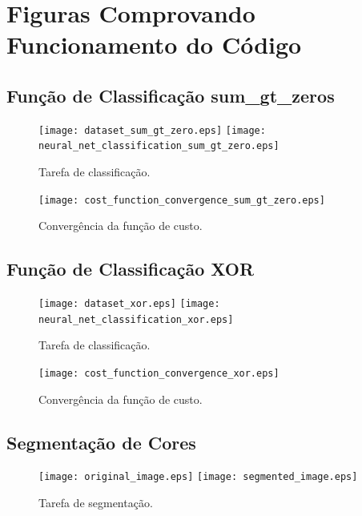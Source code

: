 \documentclass[a4paper,12pt]{article}
\begin{document}
\newpage

\section{Figuras Comprovando Funcionamento do Código}

\subsection{Função de Classificação \textnormal{sum\_gt\_zeros}}

\begin{figure}[!h]
    \centering
    \texttt{[image: dataset\_sum\_gt\_zero.eps]}
    \hfill
    \texttt{[image: neural\_net\_classification\_sum\_gt\_zero.eps]}
    \caption{Tarefa de classificação.}
\end{figure}

\begin{figure}[!h]
    \centering
    \texttt{[image: cost\_function\_convergence\_sum\_gt\_zero.eps]}
    \caption{Convergência da função de custo.}
\end{figure}

\newpage

\subsection{Função de Classificação XOR}
\begin{figure}[!h]
    \centering
    \texttt{[image: dataset\_xor.eps]}
    \hfill
    \texttt{[image: neural\_net\_classification\_xor.eps]}
    \caption{Tarefa de classificação.}
\end{figure}

\begin{figure}[!h]
    \centering
    \texttt{[image: cost\_function\_convergence\_xor.eps]}
    \caption{Convergência da função de custo.}
\end{figure}

\newpage

\subsection{Segmentação de Cores}

\begin{figure}[!h]
    \centering
    \texttt{[image: original\_image.eps]}
    \hfill
    \texttt{[image: segmented\_image.eps]}
    \caption{Tarefa de segmentação.}
\end{figure}
\end{document}
